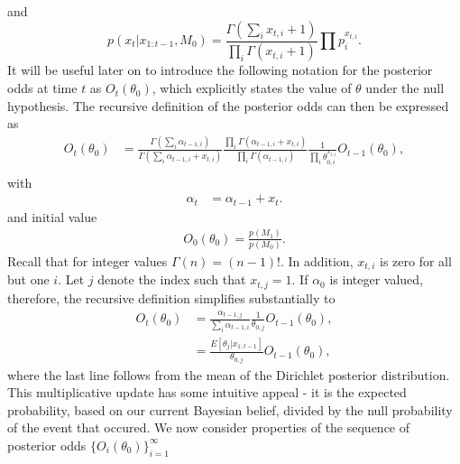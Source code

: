 \documentclass[11pt]{article}
\begin{document}
and
\begin{equation}
  \label{eq:posterior_predictive_m2}
   p(x_t|x_{1:t-1},M_0) = \frac{ \Gamma(\sum_i x_{t,i} + 1)}{\prod_i \Gamma(x_{t,i} + 1)} \prod p_i^{x_{t,i}}.
 \end{equation}
 It will be useful later on to introduce the following notation for the posterior odds at time $t$ as $O_t(\theta_0)$, which explicitly states the value of $\theta$ under the null hypothesis. The recursive definition of the posterior odds can then be expressed as
\begin{align}
  O_{t}(\theta_0) &= \frac{\Gamma(\sum_i \alpha_{t-1,i})}{\Gamma(\sum_i \alpha_{t-1,i} +  x_{t,i})} \frac{\prod_i \Gamma(\alpha_{t-1,i} + x_{t,i})}{\prod_i \Gamma(\alpha_{t-1,i})} \frac{1}{\prod_i \theta_{0,i}^{x_{t,i}}}  O_{t-1}(\theta_0),\\
\end{align}
with
\begin{align}
  \label{eq:alpha_update}
  \alpha_{t}&= \alpha_{t-1}+x_t.
\end{align}
and initial value
\begin{align}
  \label{eq:bayes_factor_seed}
O_0(\theta_0) = \frac{p(M_1)}{p(M_0)}.
\end{align}
Recall that for integer values $\Gamma(n)=(n-1)!$. In addition, $x_{t,i}$ is zero for all but one $i$. Let $j$ denote the index such that $x_{t,j}=1$. If $\alpha_0$ is integer valued, therefore, the recursive definition simplifies substantially to
\begin{align}
  \label{eq:simplified_bayes_factor}
  O_{t}(\theta_0) &= \frac{\alpha_{t-1,j}}{\sum_i \alpha_{t-1,i}} \frac{1}{\theta_{0,j}} O_{t-1}(\theta_0),\\
  &=\frac{E[\theta_j|x_{1:t-1}]}{\theta_{0,j}}  O_{t-1}(\theta_0),
\end{align}
where the last line follows from the mean of the Dirichlet posterior distribution. This multiplicative update has some intuitive appeal - it is the expected probability, based on our current Bayesian belief, divided by the null probability of the event that occured. We now consider properties of the sequence of posterior odds $\lbrace O_{i}(\theta_0) \rbrace_{i=1}^\infty $
\end{document}
